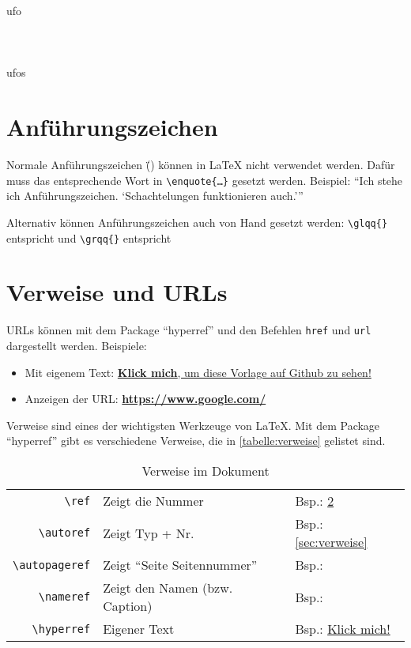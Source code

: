 	\ac{ufo} \\
	 \\
	 \\
	 \\
	\acfp{ufo}


\section{Anführungszeichen}

Normale Anführungszeichen (\"{}) können in \LaTeX{} nicht verwendet werden. Dafür muss das entsprechende Wort in \texttt{\textbackslash enquote{\{\ldots\}}} gesetzt werden. Beispiel: \enquote{Ich stehe ich Anführungszeichen. \enquote{Schachtelungen funktionieren auch.}}

Alternativ können Anführungszeichen auch von Hand gesetzt werden:
\texttt{\textbackslash glqq\{\}} entspricht \glqq{} und \texttt{\textbackslash grqq\{\}} entspricht \grqq{}

\section{Verweise und URLs}\label{sec:verweise}
URLs können mit dem Package \enquote{hyperref} und den Befehlen \texttt{href} und \texttt{url} dargestellt werden. Beispiele:

\begin{itemize}
	\item Mit eigenem Text: \href{https://github.wdf.sap.corp/vtgermany/LaTeX-Template-DHBW/}{\textbf{Klick mich}, um diese Vorlage auf Github zu sehen!}
	\item Anzeigen der URL: \textbf{\url{https://www.google.com/}}
\end{itemize}

Verweise sind eines der wichtigsten Werkzeuge von \LaTeX. Mit dem Package \enquote{hyperref} gibt es verschiedene Verweise, die in \autoref{tabelle:verweise} gelistet sind.

\begin{table}[ht]
	\centering
	\begin{tabular}{rll}
		        \texttt{\textbackslash ref} & Zeigt die Nummer                   & Bsp.: \ref{sec:verweise}                   \\
		    \texttt{\textbackslash autoref} & Zeigt Typ + Nr.                    & Bsp.: \autoref{sec:verweise}               \\
		\texttt{\textbackslash autopageref} & Zeigt \enquote{Seite Seitennummer} & Bsp.: \autopageref{sec:verweise}           \\
		    \texttt{\textbackslash nameref} & Zeigt den Namen (bzw. Caption)     & Bsp.: \nameref{sec:verweise}               \\
		   \texttt{\textbackslash hyperref} & Eigener Text                       & Bsp.: \hyperref[sec:verweise]{Klick mich!}
	\end{tabular}
	\caption{Verweise im Dokument}
	\label{tabelle:verweise}
\end{table}
